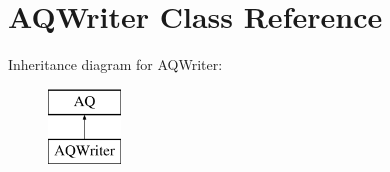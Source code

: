 \hypertarget{class_a_q_writer}{}\section{A\+Q\+Writer Class Reference}
\label{class_a_q_writer}
Inheritance diagram for A\+Q\+Writer\+:\begin{figure}[H]
\begin{center}
\leavevmode
\includegraphics[height=2.000000cm]{class_a_q_writer}
\end{center}
\end{figure}
